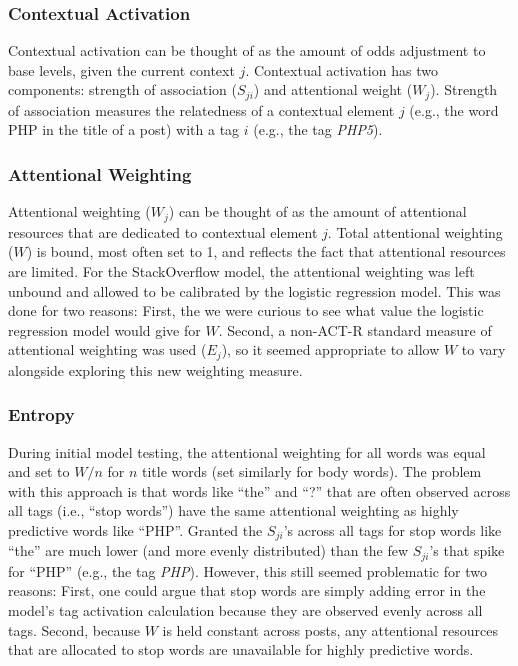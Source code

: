 \documentclass[10pt,letterpaper]{article}
\begin{document}
\subsubsection{Contextual Activation}

Contextual activation can be thought of as the amount of odds adjustment to base levels, given the current context $j$.
Contextual activation has two components: strength of association ($S_{ji}$) and attentional weight ($W_{j}$).
Strength of association measures the relatedness of a contextual element $j$ (e.g., the word PHP in the title of a post) with a tag $i$ (e.g., the tag \emph{PHP5}).

\subsubsection{Attentional Weighting}

Attentional weighting ($W_{j}$) can be thought of as the amount of attentional resources that are dedicated to contextual element $j$.
Total attentional weighting ($W$) is bound, most often set to 1, and reflects the fact that attentional resources are limited.
For the StackOverflow model, the attentional weighting was left unbound and allowed to be calibrated by the logistic regression model.
This was done for two reasons:
First, the we were curious to see what value the logistic regression model would give for $W$.
Second, a non-ACT-R standard measure of attentional weighting was used ($E_{j}$), so it seemed appropriate to allow $W$ to vary alongside exploring this new weighting measure.

\subsubsection{Entropy}

During initial model testing, the attentional weighting for all words was equal and set to $W/n$ for $n$ title words (set similarly for body words).
The problem with this approach is that words like ``the'' and ``?'' that are often observed across all tags (i.e., ``stop words'') have the same attentional weighting as highly predictive words like ``PHP''.
Granted the $S_{ji}$'s across all tags for stop words like ``the'' are much lower (and more evenly distributed) than the few $S_{ji}$'s that spike for ``PHP'' (e.g., the tag \emph{PHP}).
However, this still seemed problematic for two reasons:
First, one could argue that stop words are simply adding error in the model's tag activation calculation because they are observed evenly across all tags.
Second, because $W$ is held constant across posts, any attentional resources that are allocated to stop words are unavailable for highly predictive words.
\end{document}

